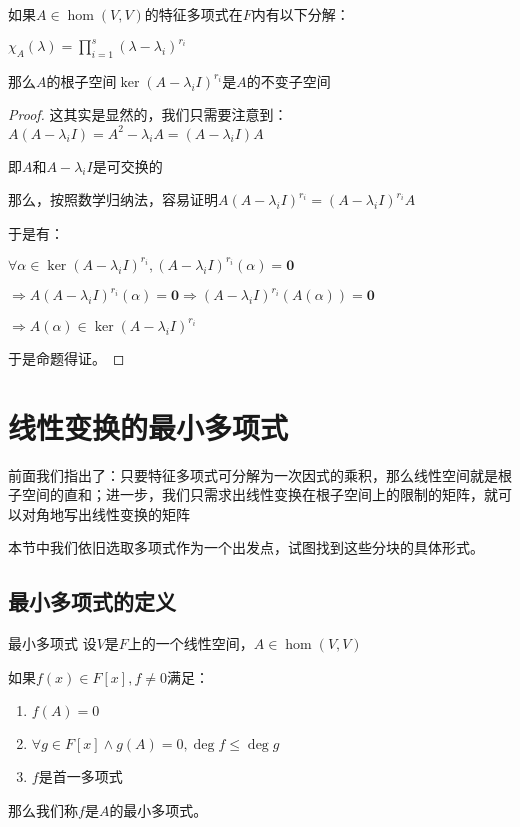 \documentclass[12pt, a4paper, oneside, UTF8]{ctexbook}
\begin{document}
\begin{para}{0}
\begin{proposition}
						如果$A \in \hom(V,V)$的特征多项式在$F$内有以下分解：

						$\chi_A (\lambda )=\prod\limits_{i=1}^{s} (\lambda-\lambda_i)^{r_i}$

						那么$A$的根子空间$\ker (A-\lambda_iI)^{r_i}$是$A$的不变子空间
					\end{proposition}
					\begin{proof}
						这其实是显然的，我们只需要注意到：$A(A-\lambda_i I)=A^2 - \lambda_i A = (A-\lambda_i I)A$
						
						即$A$和$A-\lambda_i I$是可交换的

						那么，按照数学归纳法，容易证明$A(A-\lambda_i I)^{r_i}=(A-\lambda_i I)^{r_i}A$

						于是有：

						$\forall \alpha \in \ker (A-\lambda_iI)^{r_i},(A-\lambda_iI)^{r_i}(\alpha )=\mathbf{0}$

						$\Rightarrow A(A-\lambda_iI)^{r_i}(\alpha )=\mathbf{0} \Rightarrow (A-\lambda_iI)^{r_i}(A(\alpha )) = \mathbf{0}$

						$\Rightarrow A(\alpha ) \in \ker (A-\lambda_iI)^{r_i}$

						于是命题得证。
					\end{proof}
			\end{para}
	\section{线性变换的最小多项式}
		前面我们指出了：只要特征多项式可分解为一次因式的乘积，那么线性空间就是根子空间的直和；进一步，我们只需求出线性变换在根子空间上的限制的矩阵，就可以对角地写出线性变换的矩阵

		本节中我们依旧选取多项式作为一个出发点，试图找到这些分块的具体形式。
		\subsection{最小多项式的定义}
			\begin{defn}{最小多项式}{}
				设$V$是$F$上的一个线性空间，$A \in \hom(V,V)$

				如果$f(x) \in F[x],f \neq 0$满足：

				\begin{enumerate}
					\item $f(A) = 0$
					\item $\forall g \in F[x] \wedge g(A) = 0,\operatorname{deg} f \leqslant \operatorname{deg} g$
					\item $f$是首一多项式
				\end{enumerate}
				那么我们称$f$是$A$的最小多项式。
			\end{defn}
\end{document}
